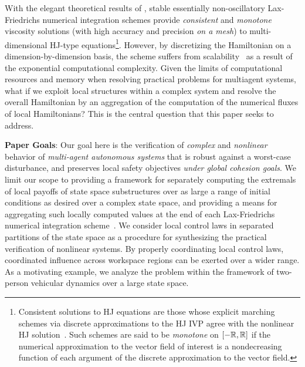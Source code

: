With the elegant theoretical results of \cite{CrandallLaxFriedrichs, Crandall1984Approx, Evans1984, OsherShuENO, Crandall1984}, stable essentially non-oscillatory  Lax-Friedrichs numerical integration schemes provide  \textit{consistent} and \textit{monotone} viscosity solutions (with high accuracy and precision \textit{on a mesh}) to multi-dimensional HJ-type equations\footnote{Consistent solutions to HJ equations are those whose explicit marching schemes via discrete  approximations to the HJ IVP agree with the nonlinear HJ solution~\cite{Crandall1984Approx}. Such schemes are said to be \textit{monotone} \eg on $\left[-\mathbb{R}, \mathbb{R}\right]$ if the numerical approximation to the vector field of interest is a nondecreasing function of each argument of the discrete approximation to the vector field.}.
However, by discretizing the Hamiltonian on a dimension-by-dimension basis, the scheme suffers from scalability~\cite{SylviaScalability, Bajcsy, Bansal} as a result of the exponential computational complexity. Given the limits of computational resources and memory when resolving practical problems for multiagent systems, what if we exploit local structures within a complex system and resolve the overall Hamiltonian by an aggregation of the computation of the numerical fluxes of local Hamiltonians? This is the central question that this paper seeks to address.


\textbf{Paper Goals}: Our goal here is the verification of  \textit{complex} and \textit{nonlinear} behavior of  \textit{multi-agent autonomous systems} that is robust against a worst-case disturbance, and preserves local safety objectives \textit{under global cohesion goals}. We limit our scope to providing a framework for separately computing the extremals of local payoffs of state space substructures over as large a range of initial conditions as desired over a complex state space,   and providing a means for aggregating such locally computed values at the end of each Lax-Friedrichs numerical integration scheme~\cite{Crandall1984Approx, OsherShuENO}. 
We consider local control laws in separated partitions of the state space as a procedure for synthesizing the practical verification of nonlinear systems. By properly coordinating local control laws, coordinated influence across workspace regions can be exerted over a wider range. 
As a motivating example, we analyze the problem within the framework of two-person vehicular dynamics over a large state space.  

